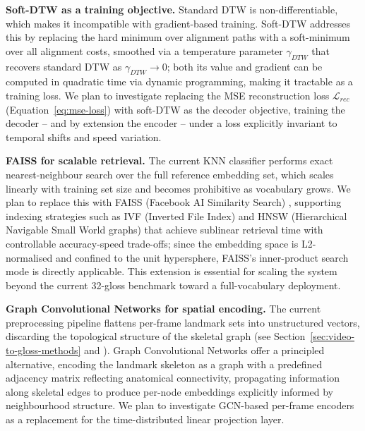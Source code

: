 \textbf{Soft-DTW as a training objective.} Standard DTW is non-differentiable,
which makes it incompatible with gradient-based training. Soft-DTW
\cite{cuturi2017softdtw} addresses this by replacing the hard minimum over
alignment paths with a soft-minimum over all alignment costs, smoothed via a
temperature parameter $\gamma_{DTW}$ that recovers standard DTW as
$\gamma_{DTW} \to 0$; both its value and gradient can be computed in quadratic
time via dynamic programming, making it tractable as a training loss. We plan
to investigate replacing the MSE reconstruction loss $\mathcal{L}_{rec}$
(Equation~\ref{eq:mse-loss}) with soft-DTW as the decoder objective, training the
decoder -- and by extension the encoder -- under a loss explicitly invariant to
temporal shifts and speed variation.

\textbf{FAISS for scalable retrieval.} The current KNN classifier performs exact
nearest-neighbour search over the full reference embedding set, which scales
linearly with training set size and becomes prohibitive as vocabulary grows. We
plan to replace this with FAISS (Facebook AI Similarity Search)
\cite{johnson2019faiss}, supporting indexing strategies such as IVF (Inverted
File Index) and HNSW (Hierarchical Navigable Small World graphs) that achieve
sublinear retrieval time with controllable accuracy-speed trade-offs; since the
embedding space is L2-normalised and confined to the unit hypersphere, FAISS's
inner-product search mode is directly applicable. This extension is essential
for scaling the system beyond the current 32-gloss benchmark toward a
full-vocabulary deployment.


\textbf{Graph Convolutional Networks for spatial encoding.} The current
preprocessing pipeline flattens per-frame landmark sets into unstructured
vectors, discarding the topological structure of the skeletal graph (see
Section~\ref{sec:video-to-gloss-methods} and \cite{correia2019stgcn}). Graph
Convolutional Networks offer a principled alternative, encoding the landmark
skeleton as a graph with a predefined adjacency matrix reflecting anatomical
connectivity, propagating information along skeletal edges to produce per-node
embeddings explicitly informed by neighbourhood structure. We plan to
investigate GCN-based per-frame encoders as a replacement for the
time-distributed linear projection layer.

